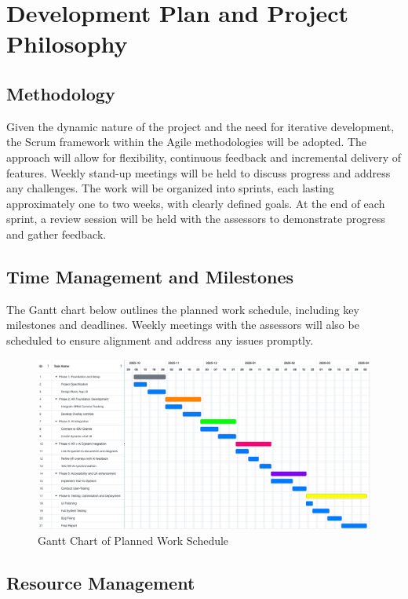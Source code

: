 \documentclass[12pt]{article}
\begin{document}
\section{Development Plan and Project Philosophy}

    \subsection{Methodology}

    Given the dynamic nature of the project and the need for iterative development, the Scrum framework within the Agile methodologies will be adopted. The approach will allow for flexibility, continuous feedback
    and incremental delivery of features. Weekly stand-up meetings will be held to discuss progress and address any challenges. The work will be organized into sprints, each lasting approximately one to two weeks,
    with clearly defined goals. At the end of each sprint, a review session will be held with the assessors to demonstrate progress and gather feedback.

    \subsection{Time Management and Milestones}
        The Gantt chart below outlines the planned work schedule, including key milestones and deadlines. Weekly meetings with the assessors will also be scheduled to ensure alignment and address any issues promptly.

        \begin{figure}[H]
        \centering
        \includegraphics[width=\textwidth]{img/GanttChart.png}
        \caption{Gantt Chart of Planned Work Schedule}
        \label{fig:GanttChart}
        \end{figure}

    \subsection{Resource Management}
\end{document}
